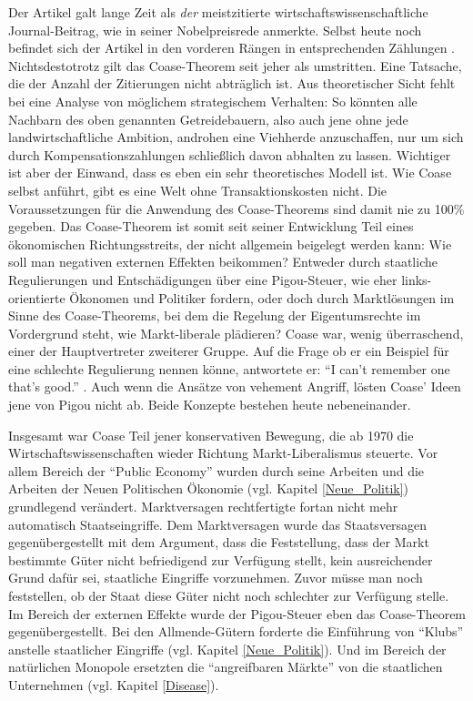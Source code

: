 Der Artikel \textcite{Coase1960} galt lange Zeit als \textit{der} meistzitierte wirtschaftswissenschaftliche Journal-Beitrag, wie \textcite{Coase1991a} in seiner Nobelpreisrede anmerkte. Selbst heute noch befindet sich der Artikel in den vorderen Rängen in entsprechenden Zählungen \parencite[S. 400]{Mergio2016}. Nichtsdestotrotz gilt das Coase-Theorem seit jeher als umstritten. Eine Tatsache, die der Anzahl der Zitierungen nicht abträglich ist. Aus theoretischer Sicht fehlt bei \textcite{Coase1960} eine Analyse von möglichem strategischem Verhalten: So könnten alle Nachbarn des oben genannten Getreidebauern, also auch jene ohne jede landwirtschaftliche Ambition, androhen eine Viehherde anzuschaffen, nur um sich durch Kompensationszahlungen schließlich davon abhalten zu lassen. Wichtiger ist aber der Einwand, dass es eben ein sehr theoretisches Modell ist. Wie Coase selbst anführt, gibt es eine Welt ohne Transaktionskosten nicht. Die Voraussetzungen für die Anwendung des Coase-Theorems sind damit nie zu 100\% gegeben. Das Coase-Theorem ist somit seit seiner Entwicklung Teil eines ökonomischen Richtungsstreits, der nicht allgemein beigelegt werden kann: Wie soll man negativen externen Effekten beikommen? Entweder durch staatliche Regulierungen und Entschädigungen über eine Pigou-Steuer, wie eher links-orientierte Ökonomen und Politiker fordern, oder doch durch Marktlösungen im Sinne des Coase-Theorems, bei dem die Regelung der Eigentumsrechte im Vordergrund steht, wie Markt-liberale plädieren? Coase war, wenig überraschend, einer der Hauptvertreter zweiterer Gruppe. Auf die Frage ob er ein Beispiel für eine schlechte Regulierung nennen könne, antwortete er: "`I can't remember one that's good."' \parencite[S. 45]{Schlafly2007}. Auch wenn \textcite{Coase1960} die Ansätze von \textcite{Pigou1920} vehement Angriff, lösten Coase' Ideen jene von Pigou nicht ab. Beide Konzepte bestehen heute nebeneinander.

Insgesamt war Coase Teil jener konservativen Bewegung, die ab 1970 die Wirtschaftswissenschaften wieder Richtung Markt-Liberalismus steuerte. Vor allem  Bereich der "`Public Economy"' wurden durch seine Arbeiten und die Arbeiten der Neuen Politischen Ökonomie (vgl. Kapitel \ref{Neue_Politik}) grundlegend verändert. Marktversagen rechtfertigte fortan nicht mehr automatisch Staatseingriffe. Dem Marktversagen wurde das Staatsversagen gegenübergestellt mit dem Argument, dass die Feststellung, dass der Markt bestimmte Güter nicht befriedigend zur Verfügung stellt, kein ausreichender Grund dafür sei, staatliche Eingriffe vorzunehmen. Zuvor müsse man noch feststellen, ob der Staat diese Güter nicht noch schlechter zur Verfügung stelle. Im Bereich der externen Effekte wurde der Pigou-Steuer eben das Coase-Theorem gegenübergestellt. Bei den Allmende-Gütern forderte \textcite{Buchanan1965} die Einführung von "`Klubs"' anstelle staatlicher Eingriffe (vgl. Kapitel \ref{Neue_Politik}). Und im Bereich der natürlichen Monopole ersetzten die "`angreifbaren Märkte"' von \textcite{Baumol1982} die staatlichen Unternehmen (vgl. Kapitel \ref{Disease}). 







